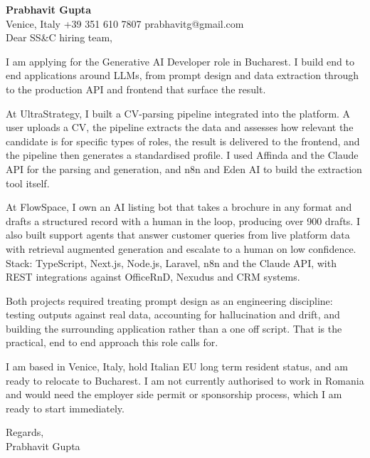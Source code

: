 \documentclass[a4paper,10.5pt]{article}
\begin{document}
\textbf{Prabhavit Gupta}\\
Venice, Italy \textbar{} +39 351 610 7807 \textbar{} prabhavitg@gmail.com\\[10pt]
Dear SS\&C hiring team,

I am applying for the Generative AI Developer role in Bucharest. I build end to end applications around LLMs, from prompt design and data extraction through to the production API and frontend that surface the result.

At UltraStrategy, I built a CV-parsing pipeline integrated into the platform. A user uploads a CV, the pipeline extracts the data and assesses how relevant the candidate is for specific types of roles, the result is delivered to the frontend, and the pipeline then generates a standardised profile. I used Affinda and the Claude API for the parsing and generation, and n8n and Eden AI to build the extraction tool itself.

At FlowSpace, I own an AI listing bot that takes a brochure in any format and drafts a structured record with a human in the loop, producing over 900 drafts. I also built support agents that answer customer queries from live platform data with retrieval augmented generation and escalate to a human on low confidence. Stack: TypeScript, Next.js, Node.js, Laravel, n8n and the Claude API, with REST integrations against OfficeRnD, Nexudus and CRM systems.

Both projects required treating prompt design as an engineering discipline: testing outputs against real data, accounting for hallucination and drift, and building the surrounding application rather than a one off script. That is the practical, end to end approach this role calls for.

I am based in Venice, Italy, hold Italian EU long term resident status, and am ready to relocate to Bucharest. I am not currently authorised to work in Romania and would need the employer side permit or sponsorship process, which I am ready to start immediately.

Regards,\\
Prabhavit Gupta
\end{document}
